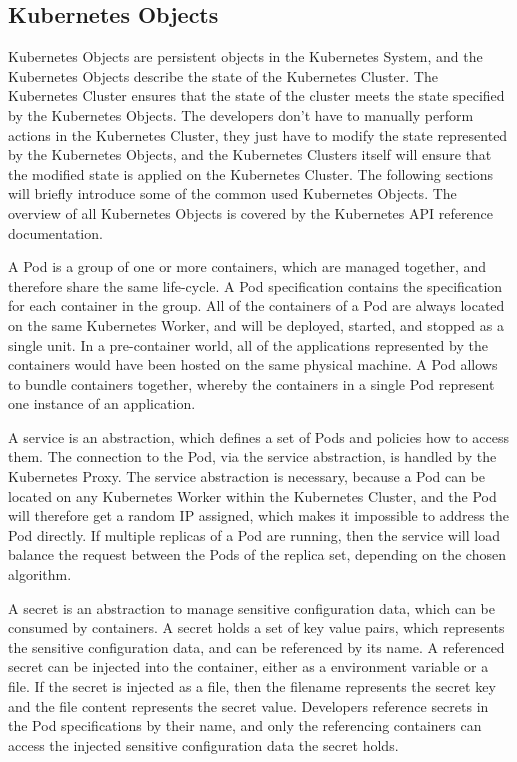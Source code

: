 \subsection{Kubernetes Objects}
\label{sec:caas-kubernetes-objects}
Kubernetes Objects are persistent objects in the Kubernetes System, and the Kubernetes Objects describe the state of the Kubernetes Cluster. The Kubernetes Cluster ensures that the state of the cluster meets the state specified by the Kubernetes Objects. The developers don't have to manually perform actions in the Kubernetes Cluster, they just have to modify the state represented by the Kubernetes Objects, and the Kubernetes Clusters itself will ensure that the modified state is applied on the Kubernetes Cluster. The following sections will briefly introduce some of the common used Kubernetes Objects. The overview of all Kubernetes Objects is covered by the Kubernetes API reference documentation\cite{CNCFKubernetesAPI2018}. 

A Pod is a group of one or more containers, which are managed together, and therefore share the same life-cycle. A Pod specification contains the specification for each container in the group. All of the containers of a Pod are always located on the same Kubernetes Worker, and will be deployed, started, and stopped as a single unit. In a pre-container world, all of the applications represented by the containers would have been hosted on the same physical machine. A Pod allows to bundle containers together, whereby the containers in a single Pod represent one instance of an  application\cite{CNCFKubernetesPods2018}. 

A service is an abstraction, which defines a set of Pods and policies how to access them. The connection to the Pod, via the service abstraction, is handled by the Kubernetes Proxy. The service abstraction is necessary, because a Pod can be located on any Kubernetes Worker within the Kubernetes Cluster, and the Pod will therefore get a random IP assigned, which makes it impossible to address the Pod directly. If multiple replicas of a Pod are running, then the service will load balance the request between the Pods of the replica set, depending on the chosen algorithm\cite{CNCFKubernetesServices2018}.

A secret is an abstraction to manage sensitive configuration data, which can be consumed by containers. A secret holds a set of key value pairs, which represents the sensitive configuration data, and can be referenced by its name. A referenced secret can be injected into the container, either as a environment variable or a file. If the secret is injected as a file, then the filename represents the secret key and the file content represents the secret value. Developers reference secrets in the Pod specifications by their name, and only the referencing containers can access the injected sensitive configuration data the secret holds\cite{CNCFKubernetesSecrets2018}. 

